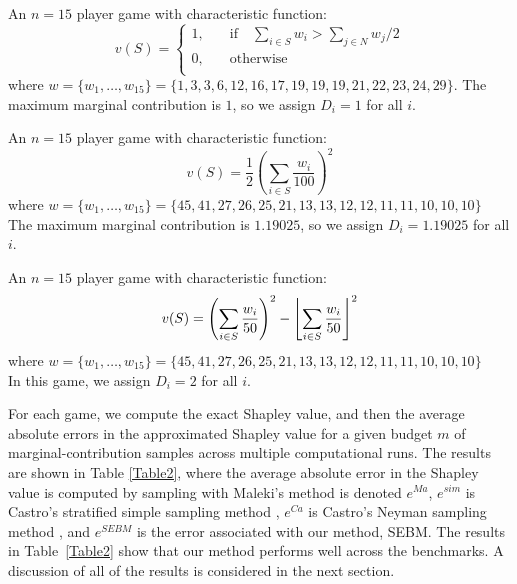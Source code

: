 \begin{example_game}
An $n=15$ player game with characteristic function:
$$v(S)=\begin{cases}
       1, &\quad\text{if}\quad \sum_{i\in S}w_i>\sum_{j\in N}w_j/2\\
       0, &\quad\text{otherwise}\\
     \end{cases}$$
where 
$w=\{w_1,\dots,w_{15}\} %
=\{ 1, 3, 3, 6, 12, 16, 17, 19, 19, 19, 21, 22, 23, 24, 29\}$.
The maximum marginal contribution is $1$, so we assign $D_i=1$ for all $i$.
\end{example_game}

\begin{example_game}
An $n=15$ player game with characteristic function:
$$v(S)=\frac{1}{2}\left(\sum_{i\in S}\frac{w_i}{100}\right)^2$$
where
$w=\{w_1,\dots,w_{15}\} = \{ 45, 41, 27, 26, 25, 21, 13, 13, 12, 12, 11, 11, 10, 10, 10 \}$\\
The maximum marginal contribution is $1.19025$, so we assign $D_i=1.19025$ for all $i$.
\end{example_game}

\begin{example_game}
An $n=15$ player game with characteristic function:
$$v(S)=\left(\sum_{i\in S}\frac{w_i}{50}\right)^2 - \floor[\Bigg]{\sum_{i\in S}\frac{w_i}{50}}^2$$
where
$w=\{w_1,\dots,w_{15}\} = \{ 45, 41, 27, 26, 25, 21, 13, 13, 12, 12, 11, 11, 10, 10, 10 \}$\\
In this game, we assign $D_i=2$ for all $i$.
\end{example_game}

%




For each game, we compute the exact Shapley value, and then the average absolute errors in the approximated Shapley value for a given budget $m$ of marginal-contribution samples across multiple computational runs.
The results are shown in Table \ref{Table2}, 
where the average absolute error in the Shapley value is computed by sampling with Maleki's method \citep{2013arXiv1306.4265M} is denoted $e^{Ma}$, $e^{sim}$ is Castro's stratified simple sampling method \citep{DBLP:journals/cor/CastroGT09}, $e^{Ca}$ is Castro's Neyman sampling method \citep{CASTRO2017180}, and $e^{SEBM}$ is the error associated with our method, SEBM. 
The results in Table~\ref{Table2} show that our method performs well across the benchmarks. 
A discussion of all of the results is considered in the next section. 


